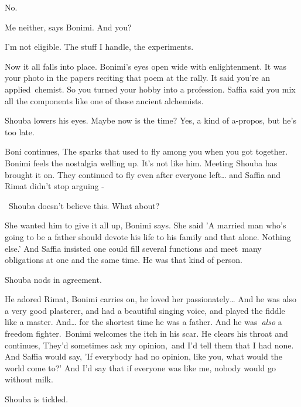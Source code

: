 \documentclass[letterpaper]{article}
\begin{document}
{\textquotedbl}No.{\textquotedbl}

{\textquotedbl}Me neither,{\textquotedbl} says Bonimi. {\textquotedbl}And you?{\textquotedbl} 

{\textquotedbl}I'm not eligible. The stuff I handle, the experiments.{\textquotedbl}

{\textquotedbl}Now it all falls into place.{\textquotedbl} Bonimi's eyes open wide with enlightenment. {\textquotedbl}It
was your photo in the papers reciting that poem at the rally. It said you're an applied\ chemist. So you turned your
hobby into a profession. Saffia said you mix all the components like one of those ancient alchemists.{\textquotedbl}

Shouba lowers his eyes. Maybe now is the time? Yes, a kind of a-propos, but he's too late. 

Boni continues, {\textquotedbl}The sparks that used to fly among you when you got together.{\textquotedbl} Bonimi feels
the nostalgia welling up. It's not like him. Meeting Shouba has brought it on. {\textquotedbl}They continued to fly
even after everyone left{\dots}  and Saffia and Rimat didn't stop arguing -{\textquotedbl}

~Shouba doesn't believe this. {\textquotedbl}What about?{\textquotedbl}

{\textquotedbl}She wanted \textcolor{black}{him} to give it all up,{\textquotedbl} Bonimi says. {\textquotedbl}She said
'A married man who's going to be a father should devote his life to his family and that alone. Nothing else.{}' And
Saffia insisted one could fill several functions and meet\ many obligations at one and the same time. He was that kind
of person.{\textquotedbl} 

Shouba nods in agreement. 

{\textquotedbl}He adored Rimat,{\textquotedbl} Bonimi carries on, {\textquotedbl}he loved her passionately{\dots} And he
was also a very good plasterer, and had a beautiful singing voice, and played the fiddle like a master. And{\dots} for
the shortest time he was a father. And he was\ \textit{also} a freedom fighter.{\textquotedbl}\ Bonimi welcomes the
itch in his scar. He clears his throat and continues, {\textquotedbl}They'd sometimes ask my opinion,\ and I'd tell
them that I had none. And Saffia would say, 'If everybody had no opinion, like you, what would the world come to?' And
I'd say that if everyone was like me, nobody would go without milk.{\textquotedbl}

Shouba is tickled.
\end{document}
